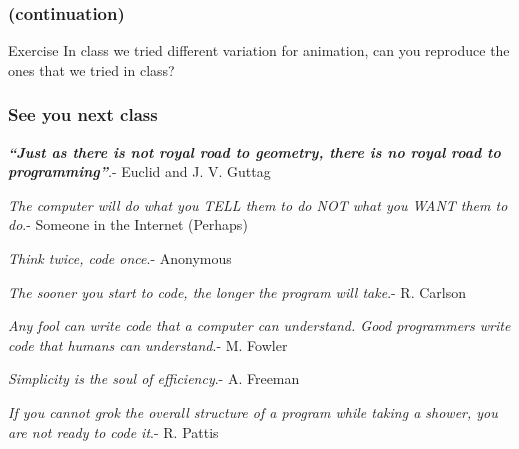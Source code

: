 \documentclass[11pt]{beamer}
\newif\ifplacelogo %
\begin{document}
\begin{frame}[fragile]
	\frametitle{\secname}
	\vspace{-2mm}
	
\end{frame}

\begin{frame}[fragile]
	\frametitle{\secname (continuation)}
	\vspace{-2mm}
	
	\begin{exampleblock}{Exercise}
		In class we tried different variation for animation, can you reproduce the ones that we tried in class?
	\end{exampleblock}
\end{frame}



\placelogotrue

\begin{frame}
\frametitle{See you next class}
\vspace{-25pt}

\textbf{\textit{``Just as there is not royal road to geometry, there is no royal road to programming''}}.- Euclid and J. V. Guttag
\vspace{7pt}

\textit{The computer will do what you TELL them to do NOT what you WANT them to do}.- Someone in the Internet (Perhaps)
\vspace{7pt}	

\textit{Think twice, code once}.- Anonymous
\vspace{7pt}

\textit{The sooner you start to code, the longer the program will take}.- R. Carlson\vspace{7pt}

\textit{Any fool can write code that a computer can understand. Good programmers write code that humans can understand}.- M. Fowler
\vspace{7pt}

\textit{Simplicity is the soul of efficiency}.- A. Freeman
\vspace{7pt}

\textit{If you cannot grok the overall structure of a program while taking a shower, you are not ready to code it}.- R. Pattis

\end{frame}
\end{document}
